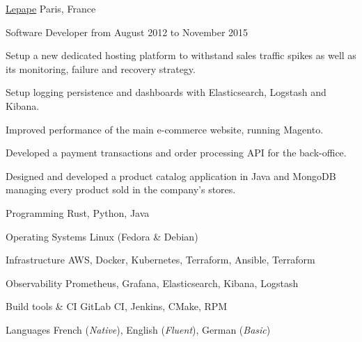 \documentclass[10pt, a4paper]{awesome-cv}
\begin{document}
\begin{cventries}

	\cventrytitle
	{\href{https://www.lepape.com}{Lepape}}
	{Paris, France}

	\cventry
	{Software Developer}
	{from August 2012 to November 2015}
	{
		\begin{cvitems}
			\item {Setup a new dedicated hosting platform to withstand sales traffic spikes as well as its monitoring, failure and recovery strategy.}
			\item {Setup logging persistence and dashboards with Elasticsearch, Logstash and Kibana.}
			\item {Improved performance of the main e-commerce website, running Magento.}
			\item {Developed a payment transactions and order processing API for the back-office.}
			\item {Designed and developed a product catalog application in Java and MongoDB managing every product sold in the company's stores.}
		\end{cvitems}
	}
\end{cventries}
\vspace{4pt}

\begin{cvskills}
	\cvskill
	{Programming}
	{Rust, Python, Java}

	\cvskill
	{Operating Systems}
	{Linux (Fedora \& Debian)}

	\cvskill
	{Infrastructure}
	{AWS, Docker, Kubernetes, Terraform, Ansible, Terraform}

	\cvskill
	{Observability}
	{Prometheus, Grafana, Elasticsearch, Kibana, Logstash}

	\cvskill
	{Build tools \& CI}
	{GitLab CI, Jenkins, CMake, RPM}

	\cvskill
	{Languages}
	{French (\emph{Native}), English (\emph{Fluent}), German (\emph{Basic})}
\end{cvskills}

\newpage
\end{document}
